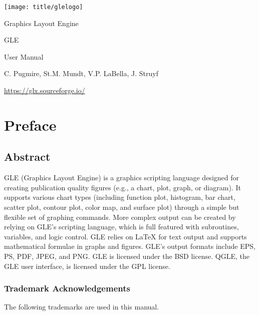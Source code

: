 \thispagestyle{empty}
\begin{center}
\texttt{[image: title/glelogo]}

{\Huge Graphics Layout Engine}

\vspace{1cm}

{\huge GLE \gleversion{}}

\vspace{1cm}

{\huge User Manual}

\vspace{1cm}

C. Pugmire, St.M. Mundt, V.P. LaBella, J. Struyf

\vspace{1cm}


\url{https://glx.sourceforge.io/}
\vfill
%
\filemodprintdate{\jobname}
\end{center}


\tableofcontents

\chapter{Preface}

\section*{Abstract}

GLE (Graphics Layout Engine) is a graphics scripting language designed for creating publication quality figures (e.g., a chart, plot, graph, or diagram). It supports various chart types (including function plot, histogram, bar chart, scatter plot, contour plot, color map, and surface plot) through a simple but flexible set of graphing commands. More complex output can be created by relying on GLE's scripting language, which is full featured with subroutines, variables, and logic control. GLE relies on \LaTeX{} for text output and supports mathematical formulae in graphs and figures. GLE's output formats include EPS, PS, PDF, JPEG, and PNG. GLE is licensed under the BSD license. QGLE, the GLE user interface, is licensed under the GPL license.

\subsection*{Trademark Acknowledgements}
The following trademarks are used in this manual.

